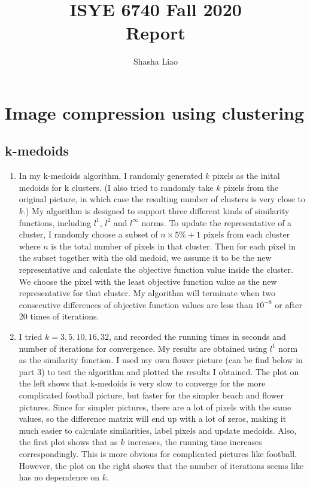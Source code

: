 \documentclass[twoside,10pt]{article}
\begin{document}
\title{ISYE 6740 Fall 2020\\ Report}
\author{Shasha Liao}
\date{}

\maketitle
\section{Image compression using clustering}

\subsection{k-medoids}
\begin{enumerate}
    \item In my k-medoids algorithm, I randomly generated $k$ pixels as the inital medoids for k clusters. (I also tried to randomly take $k$ pixels from the original picture, in which case the resulting number of clusters is very close to $k$.) My algorithm is designed to support three different kinds of similarity functions, including $l^1$, $l^2$ and $l^{\infty}$ norms. To update the representative of a cluster, I randomly choose a subset of $n\times 5\% + 1$ pixels from each cluster where $n$ is the total number of pixels in that cluster. Then for each pixel in the subset together with the old medoid, we assume it to be the new representative and calculate the objective function value inside the cluster. We choose the pixel with the least objective function value as the new representative for that cluster. My algorithm will terminate when two consecutive differences of objective function values are less than $10^{-8}$ or after 20 times of iterations. 
    
    \item I tried $k = 3,5,10,16,32$, and recorded the running times in seconds and number of iterations for convergence. My results are obtained using $l^1$ norm as the similarity function. I used my own flower picture (can be find below in part 3) to test the algorithm and plotted the results I obtained. The plot on the left shows that k-medoids is very slow to converge for the more complicated football picture, but faster for the simpler beach and flower pictures. Since for simpler pictures, there are a lot of pixels with the same values, so the difference matrix will end up with a lot of zeros, making it much easier to calculate similarities, label pixels and update medoids. Also, the first plot shows that as $k$ increases, the running time increases correspondingly. This is more obvious for complicated pictures like football. However, the plot on the right shows that the number of iterations seems like has no dependence on $k$. 
    

\end{enumerate}
\end{document}
